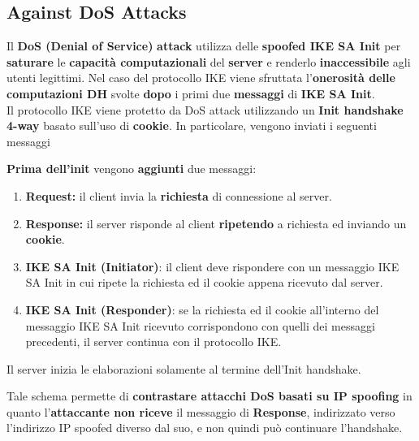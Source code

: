 \subsection{Against DoS Attacks}
Il \textbf{DoS (Denial of Service)} \textbf{attack} utilizza delle \textbf{spoofed IKE SA Init} per \textbf{saturare} le \textbf{capacità computazionali} del \textbf{server} e renderlo \textbf{inaccessibile} agli utenti legittimi. Nel caso del protocollo IKE viene sfruttata l’\textbf{onerosità delle computazioni DH} svolte \textbf{dopo} i primi due \textbf{messaggi} di \textbf{IKE SA Init}.\\
Il protocollo IKE viene protetto da DoS attack utilizzando un \textbf{Init handshake 4-way} basato sull’uso di \textbf{cookie}. In particolare, vengono inviati i seguenti messaggi
\begin{definition}
\textbf{Prima dell'init} vengono \textbf{aggiunti} due messaggi:
\begin{enumerate}
    \item \textbf{Request:} il client invia la \textbf{richiesta} di connessione al server.
    \item \textbf{Response:} il server risponde al client \textbf{ripetendo} a richiesta ed inviando un \textbf{cookie}.
    \item \textbf{IKE SA Init (Initiator)}: il client deve rispondere con un messaggio IKE SA Init in cui ripete la richiesta ed il cookie appena ricevuto dal server.
    \item \textbf{IKE SA Init (Responder)}: se la richiesta ed il cookie all’interno del messaggio IKE SA Init ricevuto corrispondono con quelli dei messaggi precedenti, il server continua con il protocollo IKE.
\end{enumerate}
Il server inizia le elaborazioni solamente al termine dell’Init handshake. 
\end{definition}
\begin{remark}
Tale schema permette di \textbf{contrastare attacchi DoS basati su IP spoofing} in quanto l’\textbf{attaccante non riceve} il messaggio di \textbf{Response}, indirizzato verso l’indirizzo IP spoofed diverso dal suo, e non quindi può continuare l’handshake.
\end{remark}
